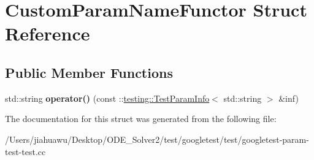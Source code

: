 \hypertarget{struct_custom_param_name_functor}{}\section{Custom\+Param\+Name\+Functor Struct Reference}
\label{struct_custom_param_name_functor}
\subsection*{Public Member Functions}
\begin{DoxyCompactItemize}
\item 
\mbox{\label{struct_custom_param_name_functor_a364d073efd6cb9a05e9d1c97565288ef}} 
std\+::string {\bfseries operator()} (const \+::\mbox{\hyperlink{structtesting_1_1_test_param_info}{testing\+::\+Test\+Param\+Info}}$<$ std\+::string $>$ \&inf)
\end{DoxyCompactItemize}


The documentation for this struct was generated from the following file\+:\begin{DoxyCompactItemize}
\item 
/\+Users/jiahuawu/\+Desktop/\+O\+D\+E\+\_\+\+Solver2/test/googletest/test/googletest-\/param-\/test-\/test.\+cc\end{DoxyCompactItemize}
